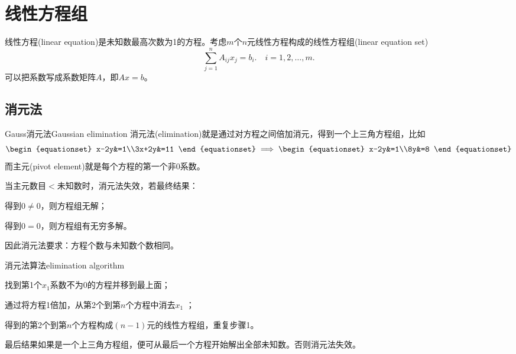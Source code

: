 \chapter{线性方程组}

线性方程(linear equation)是未知数最高次数为1的方程。考虑$m$个$n$元线性方程构成的线性方程组(linear equation set)
\[
	\sum_{j=1}^nA_{ij}x_j=b_i.\quad i=1,2,\ldots,m.
\]
可以把系数写成系数矩阵$A$，即$Ax=b$。

\section{消元法}
\label{sec:elimination}

\begin{definition}{Gauss消元法}{Gaussian elimination}
	消元法(elimination)就是通过对方程之间倍加消元，得到一个上三角方程组，比如
	\[
		\begin{equationset}
			x-2y&=1\\3x+2y&=11
		\end{equationset}\implies
		\begin{equationset}
			x-2y&=1\\8y&=8
		\end{equationset}
	\]
	而主元(pivot element)就是每个方程的第一个非0系数。
\end{definition}

\begin{remark}
	当主元数目$<$未知数时，消元法失效，若最终结果：
	\begin{compactitem}
		\item 得到$0\neq 0$，则方程组无解；
		\item 得到$0=0$，则方程组有无穷多解。
	\end{compactitem}
	因此消元法要求：方程个数与未知数个数相同。
\end{remark}

\begin{method}{消元法算法}{elimination algorithm}
	\begin{compactenum}
		\item 找到第1个$x_1$系数不为0的方程并移到最上面；%
		\item 通过将方程1倍加，从第2个到第$n$个方程中消去$x_1$ ；
		\item 得到的第2个到第$n$个方程构成$(n-1)$元的线性方程组，重复步骤1。
		\item 最后结果如果是一个上三角方程组，便可从最后一个方程开始解出全部未知数。否则消元法失效。
	\end{compactenum}
\end{method}



